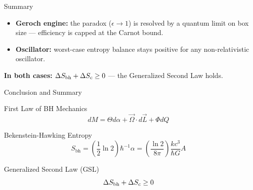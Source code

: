 \documentclass[aspectratio=169]{beamer}
\begin{document}

\begin{frame}{Summary}
\begin{itemize}
    \item \textbf{Geroch engine:} the paradox ($\epsilon\to1$) is resolved by a quantum limit on box size — efficiency is capped at the Carnot bound.
    \item \textbf{Oscillator:} worst-case entropy balance stays positive for any non-relativistic oscillator.
\end{itemize}
\centering
\textbf{In both cases: } $\Delta S_{\rm bh}+\Delta S_c \ge 0$ — the Generalized Second Law holds.
\end{frame}

\begin{frame}{Conclusion and Summary}
    \begin{block}{First Law of BH Mechanics}
        \begin{equation*}
          dM = \Theta d\alpha + \vec{\Omega} \cdot d\vec{L} + \Phi dQ
        \end{equation*}
    \end{block}
    \begin{block}{Bekenstein-Hawking Entropy}
        \begin{equation*}
          S_{\text{bh}} = \left(\frac{1}{2} \ln 2\right) \hbar^{-1} \alpha = \left(\frac{\ln 2}{8\pi}\right) \frac{k c^3}{\hbar G} A
        \end{equation*}
    \end{block}
    \begin{block}{Generalized Second Law (GSL)}
         \begin{equation*}
          \Delta S_{\rm bh}+\Delta S_c \ge 0
        \end{equation*}
    \end{block}
\end{frame}
\appendix
\end{document}
